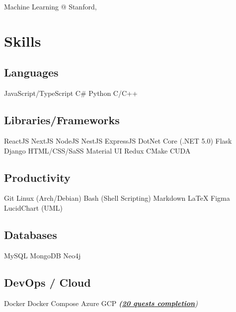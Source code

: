 \documentclass[]{openfont}
\begin{document}
\begin{minipage}[t]{0.33\textwidth}
\textbullet{} Machine Learning @ Stanford, 


\section{Skills}

\subsection{Languages}
JavaScript/TypeScript \textbullet{} C\# \textbullet{} Python \textbullet{} C/C++
\sectionsep

\subsection{Libraries/Frameworks}
ReactJS \textbullet{} NextJS \textbullet{} NodeJS \textbullet{} NestJS \textbullet{} ExpressJS  \textbullet{} DotNet Core (.NET 5.0) \textbullet{} Flask \textbullet{} Django \textbullet{} HTML/CSS/SaSS \textbullet{} Material UI \textbullet{} Redux \textbullet{} CMake \textbullet{} CUDA
\sectionsep 

\subsection{Productivity}
Git \textbullet{} Linux (Arch/Debian) \textbullet{} Bash (Shell Scripting) \textbullet{} Markdown \textbullet{} LaTeX \textbullet{} Figma  \textbullet{} LucidChart (UML)
\sectionsep

\subsection{Databases}
MySQL \textbullet{} MongoDB \textbullet{} Neo4j
\sectionsep

\subsection{DevOps / Cloud}
Docker \textbullet{} Docker Compose \textbullet{} Azure \textbullet{} GCP {\footnotesize\textit{\textbf{(\href{https://www.qwiklabs.com/public_profiles/d0984371-b6fe-43de-ae48-a4cbad94d26f}{20 quests completion}})}}
\sectionsep

%
%

\end{minipage} 
\end{document}
